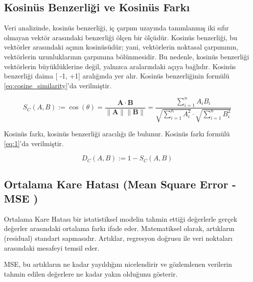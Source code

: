\subsection{Kosinüs Benzerliği ve Kosinüs Farkı}
Veri analizinde, kosinüs benzerliği, iç çarpım uzayında tanımlanmış iki sıfır olmayan vektör arasındaki benzerliği ölçen bir ölçüdür. Kosinüs benzerliği, bu vektörler arasındaki açının kosinüsüdür; yani, vektörlerin noktasal çarpımının, vektörlerin uzunluklarının çarpımına bölünmesidir. Bu nedenle, kosinüs benzerliği vektörlerin büyüklüklerine değil, yalnızca aralarındaki açıya bağlıdır. Kosinüs benzerliği daima [ -1, +1] aralığında yer alır. Kosinüs benzerliğinin formülü \eqref{eq:cosine_similarity}'da verilmiştir.



\begin{equation}
   S_C(A, B) := \cos(\theta) = \frac{\mathbf{A} \cdot \mathbf{B}}{\|\mathbf{A}\| \|\mathbf{B}\|} = \frac{\sum_{i=1}^{n} A_i B_i}{\sqrt{\sum_{i=1}^{n} A_i^2} \cdot \sqrt{\sum_{i=1}^{n} B_i^2}}
   \label{eq:cosine_similarity}
\end{equation}

Kosinüs farkı, kosinüs benzerliği aracılığı ile bulunur. Kosinüs farkı formülü \eqref{eq:1}'da verilmiştir. 

\begin{equation}
    D_C(A, B) := 1 - S_C(A, B)
    \label{eq:1}
\end{equation}


\begin{comment}
    kaynak : Singhal, Amit (2001). "Modern Information Retrieval: A Brief Overview". Bulletin of the IEEE Computer Society Technical Committee on Data Engineering 24 (4): 35–43
\end{comment}


\subsection{Ortalama Kare Hatası (Mean Square Error - MSE )}
 
Ortalama Kare Hatası bir istatistiksel modelin tahmin ettiği değerlerle gerçek değerler arasındaki ortalama farkı ifade eder. Matematiksel olarak, artıkların (residual) standart sapmasıdır. Artıklar, regresyon doğrusu ile veri noktaları arasındaki mesafeyi temsil eder.

MSE, bu artıkların ne kadar yayıldığını nicelendirir ve gözlemlenen verilerin tahmin edilen değerlere ne kadar yakın olduğunu gösterir.

